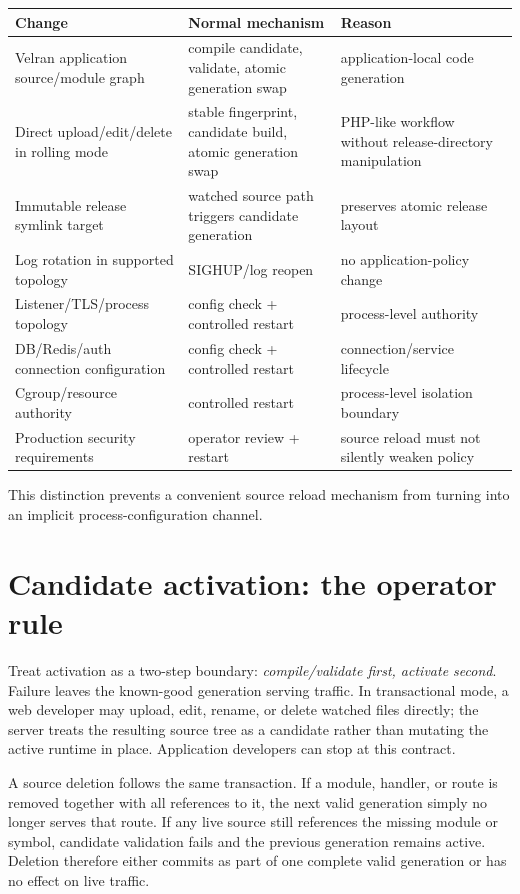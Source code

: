 \begin{longtable}{L{0.28\textwidth}L{0.30\textwidth}L{0.32\textwidth}}
\toprule
Change & Normal mechanism & Reason \\
\midrule
Velran application source/module graph & compile candidate, validate, atomic generation swap & application-local code generation \\
Direct upload/edit/delete in rolling mode & stable fingerprint, candidate build, atomic generation swap & PHP-like workflow without release-directory manipulation \\
Immutable release symlink target & watched source path triggers candidate generation & preserves atomic release layout \\
Log rotation in supported topology & SIGHUP/log reopen & no application-policy change \\
Listener/TLS/process topology & config check + controlled restart & process-level authority \\
DB/Redis/auth connection configuration & config check + controlled restart & connection/service lifecycle \\
Cgroup/resource authority & controlled restart & process-level isolation boundary \\
Production security requirements & operator review + restart & source reload must not silently weaken policy \\
\bottomrule
\end{longtable}

This distinction prevents a convenient source reload mechanism from turning into an implicit process-configuration channel.

\section{Candidate activation: the operator rule}

Treat activation as a two-step boundary: \emph{compile/validate first, activate second}. Failure leaves the known-good generation serving traffic. In transactional  mode, a web developer may upload, edit, rename, or delete watched  files directly; the server treats the resulting source tree as a candidate rather than mutating the active runtime in place. Application developers can stop at this contract.

A source deletion follows the same transaction. If a module, handler, or route is removed together with all references to it, the next valid generation simply no longer serves that route. If any live source still references the missing module or symbol, candidate validation fails and the previous generation remains active. Deletion therefore either commits as part of one complete valid generation or has no effect on live traffic.

